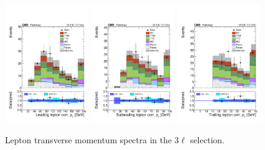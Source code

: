 \begin{figure}[htb]
	\centering 
\includegraphics[width=0.32\textwidth]{plots_leptons/lep_evtsel/3l_SR/kinMVA_input_LepGood0_conePt.pdf}
\includegraphics[width=0.32\textwidth]{plots_leptons/lep_evtsel/3l_SR/kinMVA_input_LepGood1_conePt.pdf}
\includegraphics[width=0.32\textwidth]{plots_leptons/lep_evtsel/3l_SR/kinMVA_input_LepGood2_conePt.pdf}
	\caption{Lepton transverse momentum spectra in the 3$\ell$ selection.}
	\label{fig:3l_lepPt}
\end{figure}

